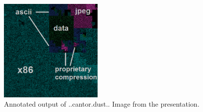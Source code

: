 \begin{figure}[!htb]
	\centering
	\includegraphics[width=0.45\textwidth]{reverse_engineering/cantor_dust.png}
	\caption{Annotated output of ..cantor.dust.. Image from the presentation.}
	\label{fig:cantor_dust}
\end{figure}